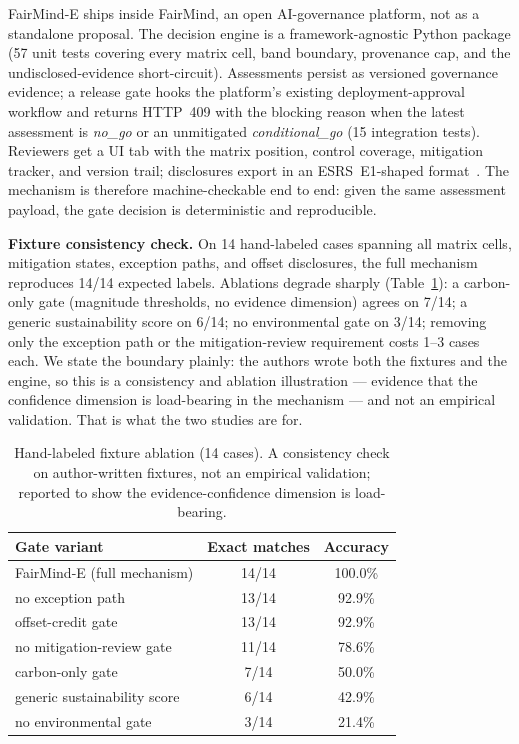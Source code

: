 \documentclass[10pt]{article}
\begin{document}
FairMind-E ships inside FairMind, an open AI-governance platform, not as a
standalone proposal. The decision engine is a framework-agnostic Python
package (57 unit tests covering every matrix cell, band boundary, provenance
cap, and the undisclosed-evidence short-circuit). Assessments persist as
versioned governance evidence; a release gate hooks the platform's existing
deployment-approval workflow and returns HTTP~409 with the blocking reason
when the latest assessment is \emph{no\_go} or an unmitigated
\emph{conditional\_go} (15 integration tests). Reviewers get a UI tab with
the matrix position, control coverage, mitigation tracker, and version trail;
disclosures export in an ESRS~E1-shaped format~\cite{csrd}. The mechanism is
therefore machine-checkable end to end: given the same assessment payload,
the gate decision is deterministic and reproducible.

\textbf{Fixture consistency check.} On 14 hand-labeled cases spanning all
matrix cells, mitigation states, exception paths, and offset disclosures, the
full mechanism reproduces 14/14 expected labels. Ablations degrade sharply
(Table~\ref{tab:ablation}): a carbon-only gate (magnitude thresholds, no
evidence dimension) agrees on 7/14; a generic sustainability score on 6/14;
no environmental gate on 3/14; removing only the exception path or the
mitigation-review requirement costs 1--3 cases each. We state the boundary
plainly: the authors wrote both the fixtures and the engine, so this is a
consistency and ablation illustration --- evidence that the confidence
dimension is load-bearing in the mechanism --- and not an empirical
validation. That is what the two studies are for.

\begin{table}[t]
\centering
\small
\begin{tabular}{@{}lcc@{}}
\toprule
Gate variant & Exact matches & Accuracy \\
\midrule
FairMind-E (full mechanism)     & 14/14 & 100.0\% \\
no exception path               & 13/14 & 92.9\% \\
offset-credit gate              & 13/14 & 92.9\% \\
no mitigation-review gate       & 11/14 & 78.6\% \\
carbon-only gate                & 7/14  & 50.0\% \\
generic sustainability score    & 6/14  & 42.9\% \\
no environmental gate           & 3/14  & 21.4\% \\
\bottomrule
\end{tabular}
\caption{Hand-labeled fixture ablation (14 cases). A consistency check on
author-written fixtures, not an empirical validation; reported to show the
evidence-confidence dimension is load-bearing.}
\label{tab:ablation}
\end{table}
\end{document}
